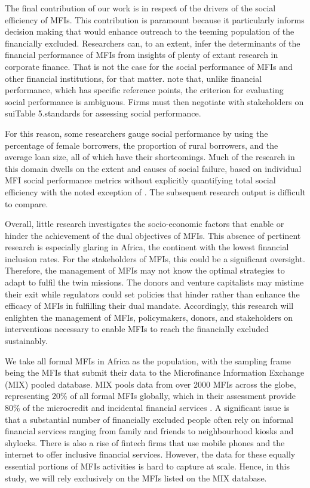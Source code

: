 \documentclass[a4paper, nobind]{templates/ociamthesis}
\begin{document}
The final contribution of our work is in respect of the drivers of the social efficiency of MFIs. This contribution is paramount because it particularly informs decision making that would enhance outreach to the teeming population of the financially excluded. Researchers can, to an extent, infer the determinants of the financial performance of MFIs from insights of plenty of extant research in corporate finance. That is not the case for the social performance of MFIs and other financial institutions, for that matter. \textcite{nason2018behavioral} note that, unlike financial performance, which has specific reference points, the criterion for evaluating social performance is ambiguous. Firms must then negotiate with stakeholders on suiTable 5.standards for assessing social performance.

For this reason, some researchers gauge social performance by using the percentage of female borrowers, the proportion of rural borrowers, and the average loan size, all of which have their shortcomings. Much of the research in this domain dwells on the extent and causes of social failure, based on individual MFI social performance metrics without explicitly quantifying total social efficiency \autocite{lebovics2016financial,louis2013profit,louis2013financial} with the noted exception of \textcite{gutierrez2009social}. The subsequent research output is difficult to compare.

Overall, little research investigates the socio-economic factors that enable or hinder the achievement of the dual objectives of MFIs. This absence of pertinent research is especially glaring in Africa, the continent with the lowest financial inclusion rates. For the stakeholders of MFIs, this could be a significant oversight. Therefore, the management of MFIs may not know the optimal strategies to adapt to fulfil the twin missions. The donors and venture capitalists may mistime their exit while regulators could set policies that hinder rather than enhance the efficacy of MFIs in fulfilling their dual mandate. Accordingly, this research will enlighten the management of MFIs, policymakers, donors, and stakeholders on interventions necessary to enable MFIs to reach the financially excluded sustainably.

We take all formal MFIs in Africa as the population, with the sampling frame being the MFIs that submit their data to the Microfinance Information Exchange (MIX) pooled database. MIX pools data from over 2000 MFIs across the globe, representing 20\% of all formal MFIs globally, which in their assessment provide 80\% of the microcredit and incidental financial services \autocite{market2017global}. A significant issue is that a substantial number of financially excluded people often rely on informal financial services ranging from family and friends to neighbourhood kiosks and shylocks. There is also a rise of fintech firms that use mobile phones and the internet to offer inclusive financial services. However, the data for these equally essential portions of MFIs activities is hard to capture at scale. Hence, in this study, we will rely exclusively on the MFIs listed on the MIX database.
\end{document}
